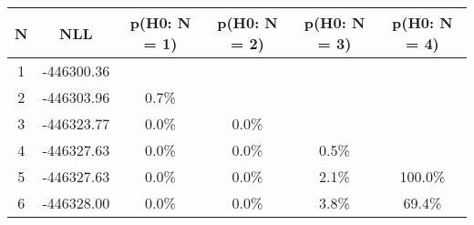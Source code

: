 \begin{table}[htb]
	\begin{center}
{\footnotesize\renewcommand{\arraystretch}{1.4}
		\begin{tabular}{cc||cccc}
			N & NLL & p(H0: N = 1) & p(H0: N = 2) & p(H0: N = 3) & p(H0: N = 4)\\ 
		\hline
1 & -446300.36 & & & & \\
2 & -446303.96 & 0.7\% & & & \\
3 & -446323.77 & 0.0\% & 0.0\% & & \\
4 & -446327.63 & 0.0\% & 0.0\% & 0.5\% & \\
5 & -446327.63 & 0.0\% & 0.0\% & 2.1\% & 100.0\% \\
6 & -446328.00 & 0.0\% & 0.0\% & 3.8\% & 69.4\% \\
	\end{tabular}
		\label{tab:lab}
	}
	\end{center}\end{table}

